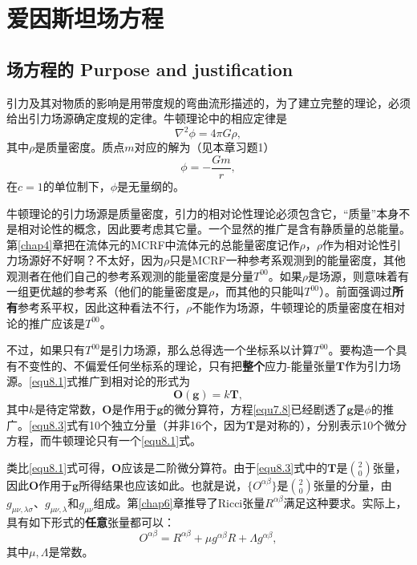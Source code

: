 \chapter{爱因斯坦场方程}
\label{chap8}

\section{场方程的 Purpose and justification}
\label{sec8.1}
引力及其对物质的影响是用带度规的弯曲流形描述的，为了建立完整的理论，必须给出引力场源确定度规的定律。牛顿理论中的相应定律是
\begin{equation}
    \nabla^2 \phi = 4\pi G \rho,
\label{equ8.1}
\end{equation}
其中$\rho$是质量密度。质点$m$对应的解为（见本章习题1）
\begin{equation}
    \phi = -\frac{G m}{r},
\label{equ8.2}
\end{equation}
在$c = 1$的单位制下，$\phi$是无量纲的。

牛顿理论的引力场源是质量密度，引力的相对论性理论必须包含它，“质量”本身不是相对论性的概念，因此要考虑其它量。一个显然的推广是含有静质量的总能量。第\ref{chap4}章把在流体元的MCRF中流体元的总能量密度记作$\rho$，$\rho$作为相对论性引力场源好不好啊？不太好，因为$\rho$只是MCRF一种参考系观测到的能量密度，其他观测者在他们自己的参考系观测的能量密度是分量$T^{00}$。如果$\rho$是场源，则意味着有一组更优越的参考系（他们的能量密度是$\rho$，而其他的只能叫$T^{00}$）。前面强调过\textbf{所有}参考系平权，因此这种看法不行，$\rho$不能作为场源，牛顿理论的质量密度在相对论的推广应该是$T^{00}$。

不过，如果只有$T^{00}$是引力场源，那么总得选一个坐标系以计算$T^{00}$。要构造一个具有不变性的、不偏爱任何坐标系的理论，只有把\textbf{整个}应力-能量张量$\mathbf{T}$作为引力场源。\eqref{equ8.1}式推广到相对论的形式为
\begin{equation}
    \mathbf{O} (\mathbf{g}) = k \mathbf{T},
\label{equ8.3}
\end{equation}
其中$k$是待定常数，$\mathbf{O}$是作用于$\mathbf{g}$的微分算符，方程\eqref{equ7.8}已经剧透了$\mathbf{g}$是$\phi$的推广。\eqref{equ8.3}式有10个独立分量（并非16个，因为$\mathbf{T}$是对称的），分别表示10个微分方程，而牛顿理论只有一个\eqref{equ8.1}式。

类比\eqref{equ8.1}式可得，$\mathbf{O}$应该是二阶微分算符。由于\eqref{equ8.3}式中的$\mathbf{T}$是$\binom{2}{0}$张量，因此$\mathbf{O}$作用于$\mathbf{g}$所得结果也应该如此。也就是说，$\{ O^{\alpha \beta} \}$是$\binom{2}{0}$张量的分量，由$g_{\mu \nu, \lambda \sigma}$、$g_{\mu \nu, \lambda}$和$g_{\mu \nu}$组成。第\ref{chap6}章推导了Ricci张量$R^{\alpha \beta}$满足这种要求。实际上，具有如下形式的\textbf{任意}张量都可以：
\begin{equation}
    O^{\alpha \beta} = R^{\alpha \beta} + \mu g^{\alpha \beta }R + \Lambda g^{\alpha \beta},
\label{equ8.4}
\end{equation}
其中$\mu, \Lambda$是常数。

